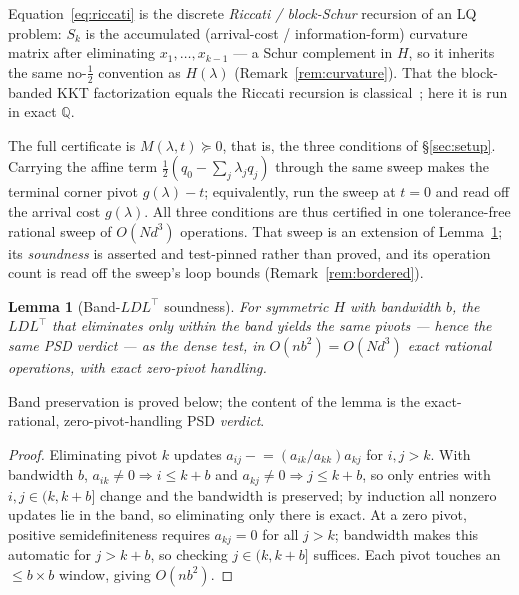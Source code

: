 \documentclass[11pt]{article}
\newtheorem{lemma}{Lemma}
\theoremstyle{definition}
\theoremstyle{remark}
\newcommand{\Q}{\mathbb{Q}}
\renewcommand{\_}{\ifdim\fontdimen3\font=0pt\relax\char`\_\else\textunderscore\fi\hspace{0pt}}
\begin{document}
Equation~\eqref{eq:riccati} is the discrete \emph{Riccati / block-Schur}
recursion of an LQ problem: $S_k$ is the accumulated (arrival-cost /
information-form) curvature matrix after eliminating $x_1,\dots,x_{k-1}$ --- a
Schur complement in $H$, so it inherits the same no-$\tfrac12$ convention as
$H(\lambda)$ (Remark~\ref{rem:curvature}). That the block-banded KKT
factorization equals the Riccati recursion is
classical~\cite{wright1993,rao1998}; here it is run in exact $\Q$.

The full certificate is $M(\lambda,t)\succeq0$, that is, the three conditions
of \S\ref{sec:setup}. Carrying the affine term
$\tfrac12(q_0-\sum_j\lambda_j q_j)$ through the same sweep makes the terminal
corner pivot $g(\lambda)-t$; equivalently, run the sweep at $t=0$ and read off
the arrival cost $g(\lambda)$. All three conditions are thus certified in one
tolerance-free rational sweep of $O(Nd^3)$ operations. That sweep is an
extension of Lemma~\ref{lem:band}; its \emph{soundness} is asserted and
test-pinned rather than proved, and its operation count is read off the
sweep's loop bounds (Remark~\ref{rem:bordered}).

\begin{lemma}[Band-$LDL^\top$ soundness]\label{lem:band}
For symmetric $H$ with bandwidth $b$, the $LDL^\top$ that eliminates only
within the band yields the same pivots --- hence the same PSD verdict --- as
the dense test, in $O(nb^2)=O(Nd^3)$ exact rational operations, with exact
zero-pivot handling.
\end{lemma}
\noindent Band preservation is proved below; the content of the lemma is the
exact-rational, zero-pivot-handling PSD \emph{verdict}.
\begin{proof}
Eliminating pivot $k$ updates $a_{ij}\mathrel{-}=(a_{ik}/a_{kk})a_{kj}$ for
$i,j>k$. With bandwidth $b$, $a_{ik}\ne0\Rightarrow i\le k+b$ and
$a_{kj}\ne0\Rightarrow j\le k+b$, so only entries with $i,j\in(k,k+b]$ change
and the bandwidth is preserved; by induction all nonzero updates lie in the
band, so eliminating only there is exact. At a zero pivot, positive
semidefiniteness requires $a_{kj}=0$ for all $j>k$; bandwidth makes this
automatic for $j>k+b$, so checking $j\in(k,k+b]$ suffices. Each pivot touches
an $\le b\times b$ window, giving $O(nb^2)$.
\end{proof}
\end{document}
